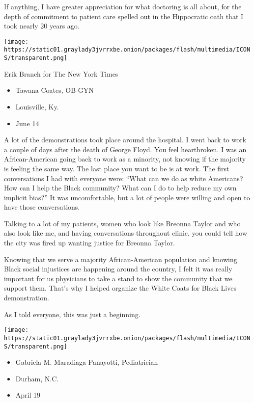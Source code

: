 If anything, I have greater appreciation for what doctoring is all
about, for the depth of commitment to patient care spelled out in the
Hippocratic oath that I took nearly 20 years ago.

\texttt{[image: https://static01.graylady3jvrrxbe.onion/packages/flash/multimedia/ICONS/transparent.png]}

Erik Branch for The New York Times

\begin{itemize}
\tightlist
\item
  Tawana Coates, OB-GYN
\item
  Louisville, Ky.
\item
  June 14
\end{itemize}

A lot of the demonstrations took place around the hospital. I went back
to work a couple of days after the death of George Floyd. You feel
heartbroken. I was an African-American going back to work as a minority,
not knowing if the majority is feeling the same way. The last place you
want to be is at work. The first conversations I had with everyone were:
``What can we do as white Americans? How can I help the Black community?
What can I do to help reduce my own implicit bias?'' It was
uncomfortable, but a lot of people were willing and open to have those
conversations.

Talking to a lot of my patients, women who look like Breonna Taylor and
who also look like me, and having conversations throughout clinic, you
could tell how the city was fired up wanting justice for Breonna Taylor.

Knowing that we serve a majority African-American population and knowing
Black social injustices are happening around the country, I felt it was
really important for us physicians to take a stand to show the community
that we support them. That's why I helped organize the White Coats for
Black Lives demonstration.

As I told everyone, this was just a beginning.

\texttt{[image: https://static01.graylady3jvrrxbe.onion/packages/flash/multimedia/ICONS/transparent.png]}

\begin{itemize}
\tightlist
\item
  Gabriela M. Maradiaga Panayotti, Pediatrician
\item
  Durham, N.C.
\item
  April 19
\end{itemize}

